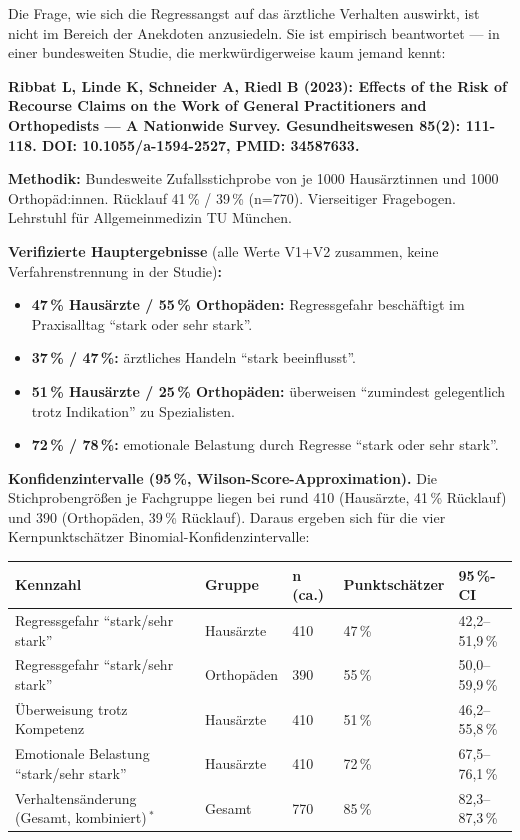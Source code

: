 \documentclass{umbruch-position}
\begin{document}
Die Frage, wie sich die Regressangst auf das ärztliche Verhalten auswirkt, ist nicht im Bereich der Anekdoten anzusiedeln. Sie ist empirisch beantwortet --- in einer bundesweiten Studie, die merkwürdigerweise kaum jemand kennt:

\textbf{Ribbat L, Linde K, Schneider A, Riedl B (2023): Effects of the Risk of Recourse Claims on the Work of General Practitioners and Orthopedists --- A Nationwide Survey. Gesundheitswesen 85(2): 111-118. DOI: 10.1055/a-1594-2527, PMID: 34587633.}

\textbf{Methodik:} Bundesweite Zufallsstichprobe von je 1000 Hausärztinnen und 1000 Orthopäd:innen. Rücklauf 41\,\% / 39\,\% (n=770). Vierseitiger Fragebogen. Lehrstuhl für Allgemeinmedizin TU München.

\textbf{Verifizierte Hauptergebnisse} (alle Werte V1+V2 zusammen, keine Verfahrenstrennung in der Studie)\textbf{:}

\begin{itemize}[nosep]
  \item \textbf{47\,\% Hausärzte / 55\,\% Orthopäden:} Regressgefahr beschäftigt im Praxisalltag ``stark oder sehr stark''.
  \item \textbf{37\,\% / 47\,\%:} ärztliches Handeln ``stark beeinflusst''.
  \item \textbf{51\,\% Hausärzte / 25\,\% Orthopäden:} überweisen ``zumindest gelegentlich trotz Indikation'' zu Spezialisten.
  \item \textbf{72\,\% / 78\,\%:} emotionale Belastung durch Regresse ``stark oder sehr stark''.
\end{itemize}

\medskip
\noindent\textbf{Konfidenzintervalle (95\,\%, Wilson-Score-Approximation).} Die Stichprobengrößen je Fachgruppe liegen bei rund 410 (Hausärzte, 41\,\% Rücklauf) und 390 (Orthopäden, 39\,\% Rücklauf). Daraus ergeben sich für die vier Kernpunkt\-schätzer Binomial-Konfidenzintervalle:

{\small
\begin{tabular}{p{4.5cm}p{1.4cm}p{1.4cm}p{2.5cm}p{2.0cm}}
\toprule
\textbf{Kennzahl} & \textbf{Gruppe} & \textbf{n (ca.)} & \textbf{Punktschätzer} & \textbf{95\,\%-CI} \\
\midrule
Regressgefahr ``stark/sehr stark'' & Hausärzte & 410 & 47\,\% & 42,2--51,9\,\% \\
Regressgefahr ``stark/sehr stark'' & Orthopäden & 390 & 55\,\% & 50,0--59,9\,\% \\
Überweisung trotz Kompetenz & Hausärzte & 410 & 51\,\% & 46,2--55,8\,\% \\
Emotionale Belastung ``stark/sehr stark'' & Hausärzte & 410 & 72\,\% & 67,5--76,1\,\% \\
Verhaltens\-änderung (Gesamt, kombiniert)\,$^{\ast}$ & Gesamt & 770 & 85\,\% & 82,3--87,3\,\% \\
\bottomrule
\end{tabular}
}
\end{document}
